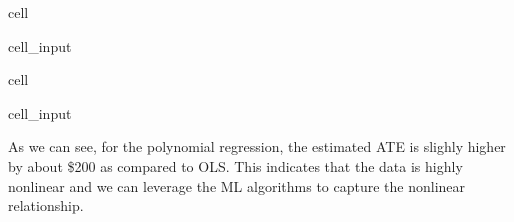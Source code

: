 \documentclass[letterpaper,10pt,english]{jupyterBook}
\begin{document}
\begin{sphinxuseclass}{cell}\begin{sphinxVerbatimInput}

\begin{sphinxuseclass}{cell_input}
\begin{sphinxVerbatim}[commandchars=\\\{\}]
  
                    
     
\end{sphinxVerbatim}

\end{sphinxuseclass}\end{sphinxVerbatimInput}

\end{sphinxuseclass}
\begin{sphinxuseclass}{cell}\begin{sphinxVerbatimInput}

\begin{sphinxuseclass}{cell_input}
\begin{sphinxVerbatim}[commandchars=\\\{\}]
   
         
                           
\end{sphinxVerbatim}

\end{sphinxuseclass}\end{sphinxVerbatimInput}

\end{sphinxuseclass}
\sphinxAtStartPar
As we can see, for the polynomial regression, the estimated ATE is slighly higher by about \$200 as compared to OLS. This indicates that the data is highly nonlinear and we can leverage the ML algorithms to capture the nonlinear relationship.
\end{document}

